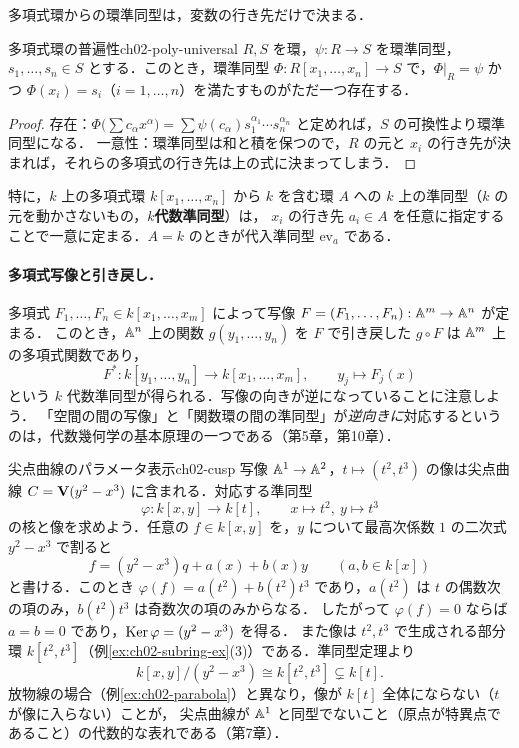 多項式環からの環準同型は，変数の行き先だけで決まる．

\begin{myprop}{多項式環の普遍性}{ch02-poly-universal}
$R,S$ を環，$\psi:R\to S$ を環準同型，$s_1,\dots,s_n\in S$ とする．このとき，環準同型
$\Phi:R[x_1,\dots,x_n]\to S$ で，$\Phi|_R=\psi$ かつ $\Phi(x_i)=s_i$（$i=1,\dots,n$）を満たすものがただ一つ存在する．
\end{myprop}

\begin{proof}
存在：$\Phi\big(\sum c_\alpha x^\alpha\big)=\sum\psi(c_\alpha)s_1^{\alpha_1}\cdots s_n^{\alpha_n}$ と定めれば，$S$ の可換性より環準同型になる．
一意性：環準同型は和と積を保つので，$R$ の元と $x_i$ の行き先が決まれば，それらの多項式の行き先は上の式に決まってしまう．
\end{proof}

特に，$k$ 上の多項式環 $k[x_1,\dots,x_n]$ から $k$ を含む環 $A$ への $k$ 上の準同型（$k$ の元を動かさないもの，\textbf{$k$代数準同型}）は，
$x_i$ の行き先 $a_i\in A$ を任意に指定することで一意に定まる．$A=k$ のときが代入準同型 $\mathrm{ev}_a$ である．

\paragraph{多項式写像と引き戻し．}
多項式 $F_1,\dots,F_n\in k[x_1,\dots,x_m]$ によって写像 $F=(F_1,\dots,F_n):\mathbb{A}^m\to\mathbb{A}^n$ が定まる．
このとき，$\mathbb{A}^n$ 上の関数 $g(y_1,\dots,y_n)$ を $F$ で引き戻した $g\circ F$ は $\mathbb{A}^m$ 上の多項式関数であり，
\[
  F^*:k[y_1,\dots,y_n]\to k[x_1,\dots,x_m],\qquad y_j\mapsto F_j(x)
\]
という $k$ 代数準同型が得られる．写像の向きが逆になっていることに注意しよう．
「空間の間の写像」と「関数環の間の準同型」が\emph{逆向きに}対応するというのは，代数幾何学の基本原理の一つである（第5章，第10章）．

\begin{myex}{尖点曲線のパラメータ表示}{ch02-cusp}
写像 $\mathbb{A}^1\to\mathbb{A}^2$，$t\mapsto(t^2,t^3)$ の像は尖点曲線 $C=\mathbf{V}(y^2-x^3)$ に含まれる．対応する準同型
\[
  \varphi:k[x,y]\to k[t],\qquad x\mapsto t^2,\ y\mapsto t^3
\]
の核と像を求めよう．任意の $f\in k[x,y]$ を，$y$ について最高次係数 $1$ の二次式 $y^2-x^3$ で割ると
\[
  f=(y^2-x^3)q+a(x)+b(x)y\qquad(a,b\in k[x])
\]
と書ける．このとき $\varphi(f)=a(t^2)+b(t^2)t^3$ であり，$a(t^2)$ は $t$ の偶数次の項のみ，$b(t^2)t^3$ は奇数次の項のみからなる．
したがって $\varphi(f)=0$ ならば $a=b=0$ であり，$\operatorname{Ker}\varphi=(y^2-x^3)$ を得る．
また像は $t^2,t^3$ で生成される部分環 $k[t^2,t^3]$（例\ref{ex:ch02-subring-ex}(3)）である．準同型定理より
\[
  k[x,y]/(y^2-x^3)\cong k[t^2,t^3]\subsetneq k[t].
\]
放物線の場合（例\ref{ex:ch02-parabola}）と異なり，像が $k[t]$ 全体にならない（$t$ が像に入らない）ことが，
尖点曲線が $\mathbb{A}^1$ と同型でないこと（原点が特異点であること）の代数的な表れである（第7章）．
\end{myex}

